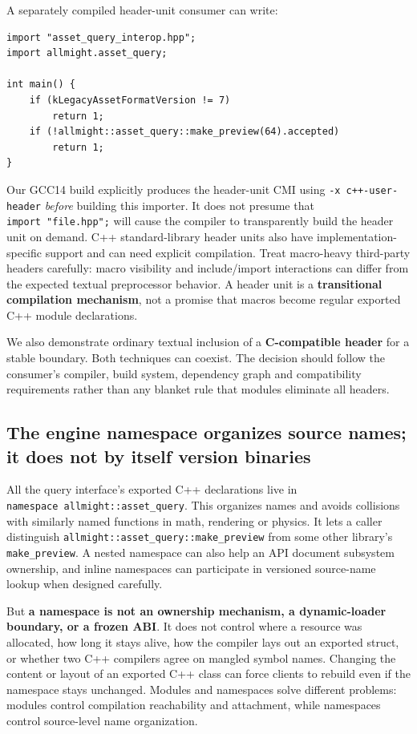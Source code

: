 A separately compiled header-unit consumer can write:

\begin{verbatim}
import "asset_query_interop.hpp";
import allmight.asset_query;

int main() {
    if (kLegacyAssetFormatVersion != 7)
        return 1;
    if (!allmight::asset_query::make_preview(64).accepted)
        return 1;
}
\end{verbatim}

Our GCC14 build explicitly produces the header-unit CMI using \texttt{-x\ c++-user-header} \emph{before} building this importer. It does not presume that \texttt{import\ "file.hpp";} will cause the compiler to transparently build the header unit on demand. C++ standard-library header units also have implementation-specific support and can need explicit compilation. Treat macro-heavy third-party headers carefully: macro visibility and include/import interactions can differ from the expected textual preprocessor behavior. A header unit is a \textbf{transitional compilation mechanism}, not a promise that macros become regular exported C++ module declarations.

We also demonstrate ordinary textual inclusion of a \textbf{C-compatible header} for a stable boundary. Both techniques can coexist. The decision should follow the consumer's compiler, build system, dependency graph and compatibility requirements rather than any blanket rule that modules eliminate all headers.

\subsection{The engine namespace organizes source names; it does not by itself version binaries}\label{01-foundations-i-ch006-the-engine-namespace-organizes-source-names-it-does-not-by-itself-version-binaries}

All the query interface's exported C++ declarations live in \texttt{namespace\ allmight::asset\_query}. This organizes names and avoids collisions with similarly named functions in math, rendering or physics. It lets a caller distinguish \texttt{allmight::asset\_query::make\_preview} from some other library's \texttt{make\_preview}. A nested namespace can also help an API document subsystem ownership, and inline namespaces can participate in versioned source-name lookup when designed carefully.

But \textbf{a namespace is not an ownership mechanism, a dynamic-loader boundary, or a frozen ABI}. It does not control where a resource was allocated, how long it stays alive, how the compiler lays out an exported struct, or whether two C++ compilers agree on mangled symbol names. Changing the content or layout of an exported C++ class can force clients to rebuild even if the namespace stays unchanged. Modules and namespaces solve different problems: modules control compilation reachability and attachment, while namespaces control source-level name organization.

